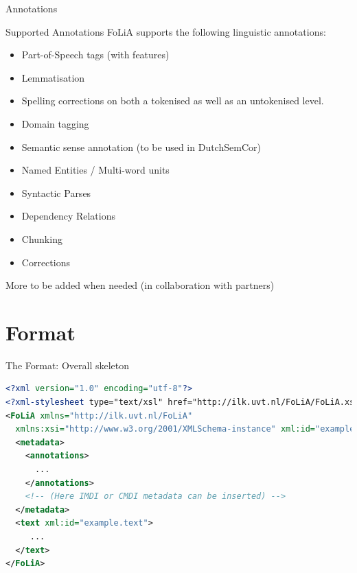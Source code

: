 \documentclass[compress]{beamer}
\begin{document}
\begin{frame}{Annotations}
    \begin{block}{Supported Annotations}
        FoLiA supports the following linguistic annotations:
        \begin{itemize}
            \item Part-of-Speech tags (with features)
            \item Lemmatisation
            \item Spelling corrections on both a tokenised as well as an untokenised level.
            \item Domain tagging
            \item Semantic sense annotation (to be used in DutchSemCor)
            \item Named Entities / Multi-word units
            \item Syntactic Parses
            \item Dependency Relations
            \item Chunking
            \item Corrections
        \end{itemize}
    
        More to be added when needed (in collaboration with partners)

    \end{block}
\end{frame}

\section{Format}

\begin{frame}{The Format: Overall skeleton}
    \begin{lstlisting}[language=xml]
<?xml version="1.0" encoding="utf-8"?>
<?xml-stylesheet type="text/xsl" href="http://ilk.uvt.nl/FoLiA/FoLiA.xsl"?>
<FoLiA xmlns="http://ilk.uvt.nl/FoLiA"
  xmlns:xsi="http://www.w3.org/2001/XMLSchema-instance" xml:id="example">
  <metadata>    
    <annotations>
      ...
    </annotations>    
    <!-- (Here IMDI or CMDI metadata can be inserted) -->
  </metadata>
  <text xml:id="example.text">
     ...
  </text>
</FoLiA>  
    \end{lstlisting}
\end{frame}
\end{document}
